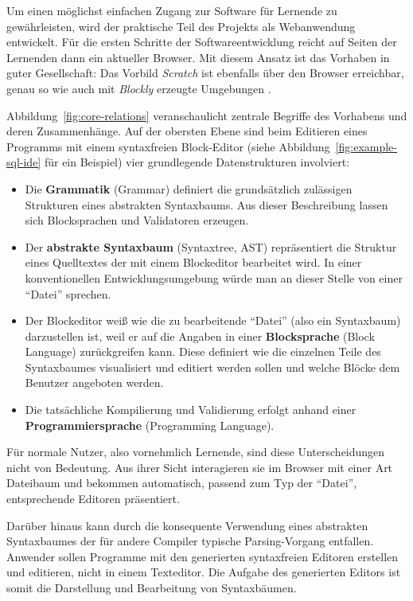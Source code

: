 \documentclass[paper=a4,fontsize=11pt,parskip=half]{scrartcl}
\begin{document}
Um einen möglichst einfachen Zugang zur Software für Lernende zu gewährleisten, wird der praktische Teil des Projekts als Webanwendung entwickelt. Für die ersten Schritte der Softwareentwicklung reicht auf Seiten der Lernenden dann ein aktueller Browser. Mit diesem Ansatz ist das Vorhaben in guter Gesellschaft: Das Vorbild \textit{Scratch} ist ebenfalls über den Browser erreichbar, genau so wie auch mit \textit{Blockly} erzeugte Umgebungen \cite[vgl. S. 28]{riemer_blattwerkzeug_2016}.

Abbildung~\ref{fig:core-relations} veranschaulicht zentrale Begriffe des Vorhabens und deren Zusammenhänge. Auf der obersten Ebene sind beim Editieren eines Programms mit einem syntaxfreien Block-Editor (siehe Abbildung~\ref{fig:example-sql-ide} für ein Beispiel) vier grundlegende Datenstrukturen involviert:

\begin{itemize}
\item Die \textbf{Grammatik} (Grammar) definiert die grundsätzlich zulässigen Strukturen eines abstrakten Syntaxbaums. Aus dieser Beschreibung lassen sich Blocksprachen und Validatoren erzeugen.
\item Der \textbf{abstrakte Syntaxbaum} (Syntaxtree, AST) repräsentiert die Struktur eines Quelltextes der mit einem Blockeditor bearbeitet wird. In einer konventionellen Entwicklungsumgebung würde man an dieser Stelle von einer \enquote{Datei} sprechen.
\item Der Blockeditor weiß wie die zu bearbeitende \enquote{Datei} (also ein Syntaxbaum) darzustellen ist, weil er auf die Angaben in einer \textbf{Blocksprache} (Block Language) zurückgreifen kann. Diese definiert wie die einzelnen Teile des Syntaxbaumes visualisiert und editiert werden sollen und welche Blöcke dem Benutzer angeboten werden.
\item Die tatsächliche Kompilierung und Validierung erfolgt anhand einer \textbf{Programmiersprache} (Programming Language).
\end{itemize}

Für normale Nutzer, also vornehmlich Lernende, sind diese Unterscheidungen nicht von Bedeutung. Aus ihrer Sicht interagieren sie im Browser mit einer Art Dateibaum und bekommen automatisch, passend zum Typ der \enquote{Datei}, entsprechende Editoren präsentiert.

Darüber hinaus kann durch die konsequente Verwendung eines abstrakten Syntaxbaumes der für andere Compiler typische Parsing-Vorgang entfallen. Anwender sollen Programme mit den generierten syntaxfreien Editoren erstellen und editieren, nicht in einem Texteditor. Die Aufgabe des generierten Editors ist somit die Darstellung und Bearbeitung von Syntaxbäumen.
\end{document}
